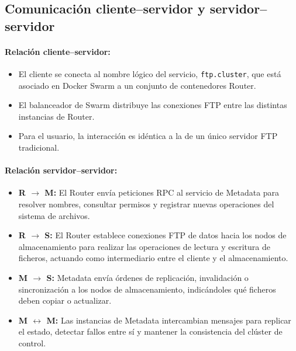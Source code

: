\documentclass{article}
\begin{document}
\subsection{Comunicación cliente–servidor y servidor–servidor}

\paragraph{Relación cliente–servidor:}
\begin{itemize}
    \item El cliente se conecta al nombre lógico del servicio, \texttt{ftp.cluster}, que está asociado en Docker Swarm a un conjunto de contenedores Router.
    \item El balanceador de Swarm distribuye las conexiones FTP entre las distintas instancias de Router.
    \item Para el usuario, la interacción es idéntica a la de un único servidor FTP tradicional.
\end{itemize}

\paragraph{Relación servidor–servidor:}
\begin{itemize}
    \item \textbf{R $\rightarrow$ M:} El Router envía peticiones RPC al servicio de Metadata para resolver nombres, consultar permisos y registrar nuevas operaciones del sistema de archivos.
    \item \textbf{R $\rightarrow$ S:} El Router establece conexiones FTP de datos hacia los nodos de almacenamiento para realizar las operaciones de lectura y escritura de ficheros, actuando como intermediario entre el cliente y el almacenamiento.
    \item \textbf{M $\rightarrow$ S:} Metadata envía órdenes de replicación, invalidación o sincronización a los nodos de almacenamiento, indicándoles qué ficheros deben copiar o actualizar.
    \item \textbf{M $\leftrightarrow$ M:} Las instancias de Metadata intercambian mensajes para replicar el estado, detectar fallos entre sí y mantener la consistencia del clúster de control.
\end{itemize}
\end{document}
